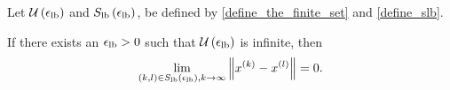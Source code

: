 

\begin{lemma}
\label{contradiction_portion}
Let $\ulb$ and $\slb$, be defined by \cref{define_the_finite_set} and \cref{define_slb}.



If there exists an $\elb > 0$ such that $\ulb$ is infinite, then
\begin{align*}
\lim_{(k, l) \in\slb, k \to \infty} \left\|\xk - \xl\right\| = 0.
\end{align*}


\end{lemma}

